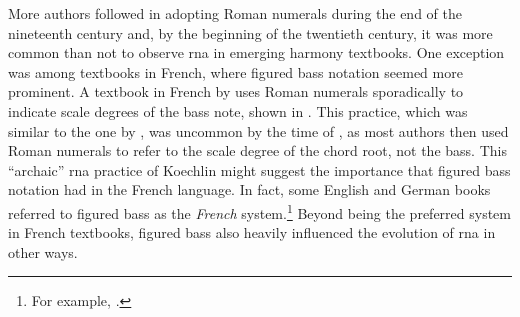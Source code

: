 

More authors followed in adopting Roman numerals during the
end of the nineteenth century and, by the beginning of the
twentieth century, it was more common than not to observe
\gls{rna} in emerging harmony textbooks. One exception was
among textbooks in French, where figured bass notation
seemed more prominent. A textbook in French by
\textcite{koechlin1928traite} uses Roman numerals
sporadically to indicate scale degrees of the bass note,
shown in .
This practice, which was similar to the one by
\textcite{hamilton1840catechism}, was uncommon by the time
of \textcite{koechlin1928traite}, as most authors then used
Roman numerals to refer to the scale degree of the chord
root, not the bass. This ``archaic'' \gls{rna} practice of
Koechlin might suggest the importance that figured bass
notation had in the French language. In fact, some English
and German books referred to figured bass as the
\emph{French} system.\footnote{For example,
\textcite{norris1894practical}.} Beyond being the preferred
system in French textbooks, figured bass also heavily
influenced the evolution of \gls{rna} in other ways.

